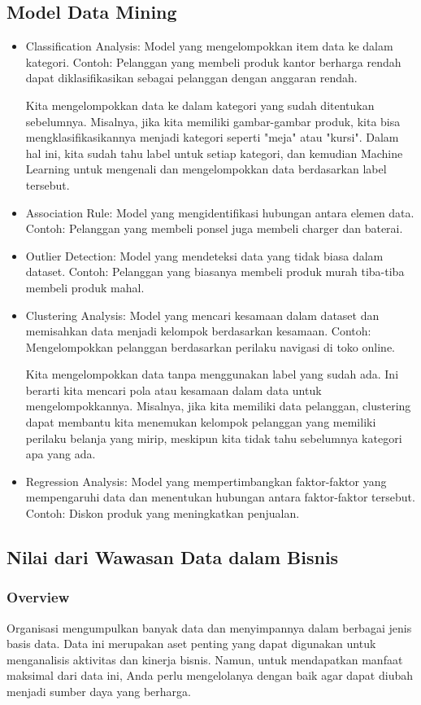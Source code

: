 \documentclass{article}
\begin{document}
\subsection{Model Data Mining}
\begin{itemize}
    \item Classification Analysis: Model yang mengelompokkan item data ke dalam kategori. Contoh: Pelanggan yang membeli produk kantor berharga rendah dapat diklasifikasikan sebagai pelanggan dengan anggaran rendah.

          Kita mengelompokkan data ke dalam kategori yang sudah ditentukan sebelumnya. Misalnya, jika kita memiliki gambar-gambar produk, kita bisa mengklasifikasikannya menjadi kategori seperti "meja" atau "kursi". Dalam hal ini, kita sudah tahu label untuk setiap kategori, dan kemudian Machine Learning untuk mengenali dan mengelompokkan data berdasarkan label tersebut.
    \item Association Rule: Model yang mengidentifikasi hubungan antara elemen data. Contoh: Pelanggan yang membeli ponsel juga membeli charger dan baterai.
    \item Outlier Detection: Model yang mendeteksi data yang tidak biasa dalam dataset. Contoh: Pelanggan yang biasanya membeli produk murah tiba-tiba membeli produk mahal.
    \item Clustering Analysis: Model yang mencari kesamaan dalam dataset dan memisahkan data menjadi kelompok berdasarkan kesamaan. Contoh: Mengelompokkan pelanggan berdasarkan perilaku navigasi di toko online.

          Kita mengelompokkan data tanpa menggunakan label yang sudah ada. Ini berarti kita mencari pola atau kesamaan dalam data untuk mengelompokkannya. Misalnya, jika kita memiliki data pelanggan, clustering dapat membantu kita menemukan kelompok pelanggan yang memiliki perilaku belanja yang mirip, meskipun kita tidak tahu sebelumnya kategori apa yang ada.
    \item Regression Analysis: Model yang mempertimbangkan faktor-faktor yang mempengaruhi data dan menentukan hubungan antara faktor-faktor tersebut. Contoh: Diskon produk yang meningkatkan penjualan.
\end{itemize}

\subsection{Nilai dari Wawasan Data dalam Bisnis}
\subsubsection{Overview}
Organisasi mengumpulkan banyak data dan menyimpannya dalam berbagai jenis basis data. Data ini merupakan aset penting yang dapat digunakan untuk menganalisis aktivitas dan kinerja bisnis. Namun, untuk mendapatkan manfaat maksimal dari data ini, Anda perlu mengelolanya dengan baik agar dapat diubah menjadi sumber daya yang berharga.
\end{document}
